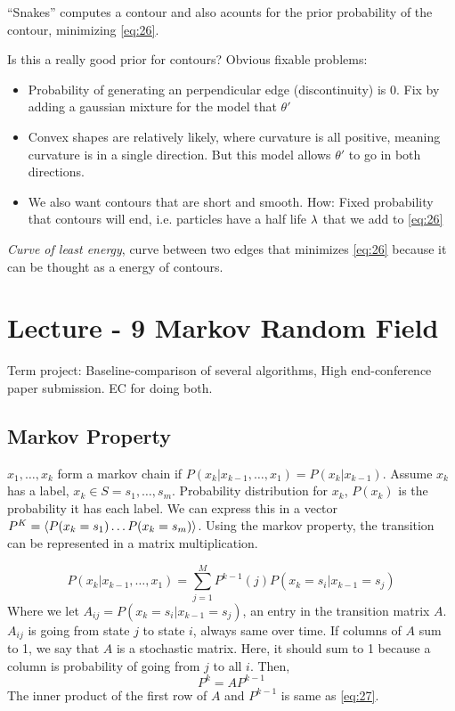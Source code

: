 ``Snakes'' computes a contour and also acounts for the prior probability of
the contour, minimizing \eqref{eq:26}.

Is this a really good prior for contours? Obvious fixable problems:
\begin{itemize}
\item Probability of generating an perpendicular edge (discontinuity)
  is 0. Fix by adding a gaussian mixture for the model that $\theta'$
\item Convex shapes are relatively likely, where curvature is all
  positive, meaning curvature is in a single direction. But this model
  allows $\theta'$ to go in both directions.
\item We also want contours that are short and smooth. How: Fixed
  probability that contours will end, i.e. particles have a half life
  $\lambda$ that we add to \eqref{eq:26}
\end{itemize}

\emph{Curve of least energy}, curve between two edges that minimizes
\eqref{eq:26} because it can be thought as a energy of contours. 


\pagebreak

\section{Lecture - 9 Markov Random Field}
\label{sec:lecture-9}
Term project: Baseline-comparison of several algorithms, High
end-conference paper submission.
EC for doing both.

\subsection{Markov Property}
\label{sec:markov-property}
$x_1, \dots, x_k$ form a markov chain if $P(x_k | x_{k-1}, \dots, x_1)
= P(x_k | x_{k-1})$.
Assume $x_k$ has a label,  $x_k \in S = {s_1, \dots,
  s_m}$. Probability distribution for $x_k$, $P(x_k)$ is the probability it has
each label. We can express this in a vector $P^K = \langle P(x_k=s_1)
\dots P(x_k=s_m)\rangle$. Using the markov property, the transition can be
represented in a matrix multiplication.

\begin{equation}
  \label{eq:27}
P(x_k | x_{k-1}, \dots, x_1) = \sum_{j=1}^M P^{k-1}(j)P(x_k=s_i |
x_{k-1} = s_j)  
\end{equation}
Where we let $A_{ij} = P(x_k=s_i |x_{k-1} = s_j)$, an entry in the transition
matrix $A$.$A_{ij}$ is going from state $j$ to state $i$, always same
over time.  If columns of $A$ sum to 1, we say that $A$ is a
stochastic matrix. Here, it should sum to 1 because a column is probability of going from $j$ to all
$i$. Then, 
\begin{equation}
  \label{eq:28}
  P^k = AP^{k-1}
\end{equation}
The inner product of the first row of $A$ and $P^{k-1}$ is same as \eqref{eq:27}.

